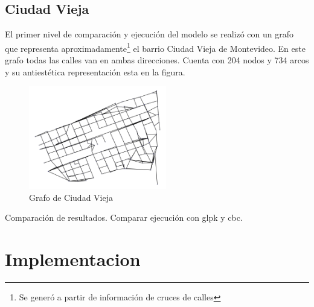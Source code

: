 \documentclass{article}
\begin{document}
  \subsection*{Ciudad Vieja}

  El primer nivel de comparación y ejecución del modelo se realizó con un grafo que representa aproximadamente\footnote{Se generó a partir de información de cruces de calles} el barrio Ciudad Vieja de Montevideo. En este grafo todas las calles van en ambas direcciones. Cuenta con 204 nodos y 734 arcos y su antiestética representación esta en la figura.

  \begin{figure}[]
    \centering
    \includegraphics[width=6cm]{imgs/mdeo_med.png}
    \caption{Grafo de Ciudad Vieja}
    \label{ciudadvieja}
  \end{figure}

  Comparación de resultados.
  Comparar ejecución con glpk y cbc.

  \section*{Implementacion}
\end{document}
